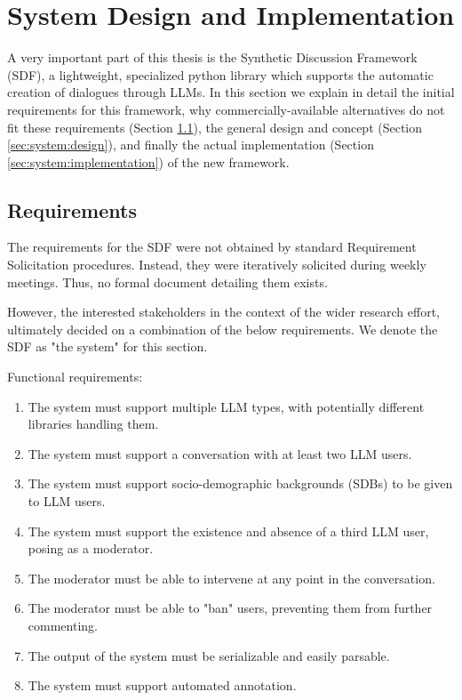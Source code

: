 %
\chapter{System Design and Implementation}
\label{sec:system}

A very important part of this thesis is the Synthetic Discussion Framework (SDF), a lightweight, specialized python library which supports the automatic creation of dialogues through LLMs. In this section we explain in detail the initial requirements for this framework, why commercially-available alternatives do not fit these requirements (Section \ref{sec:system:requirements}), the general design and concept (Section \ref{sec:system:design}), and finally the actual implementation (Section \ref{sec:system:implementation}) of the new framework.

\section{Requirements}
\label{sec:system:requirements}


The requirements for the SDF were not obtained by standard Requirement Solicitation procedures. Instead, they were iteratively solicited during weekly meetings. Thus, no formal document detailing them exists. 

However, the interested stakeholders in the context of the wider research effort, ultimately decided on a combination of the below requirements. We denote the SDF as "the system" for this section.

Functional requirements:
\begin{enumerate}
	\item The system must support multiple LLM types, with potentially different libraries handling them.
	\item The system must support a conversation with at least two LLM users.
	\item The system must support socio-demographic backgrounds (SDBs) to be given to LLM users.
	\item The system must support the existence and absence of a third LLM user, posing as a moderator.
	\item The moderator must be able to intervene at any point in the conversation.
	\item The moderator must be able to "ban" users, preventing them from further commenting.
	\item The output of the system must be serializable and easily parsable.
	\item The system must support automated annotation.
\end{enumerate}

